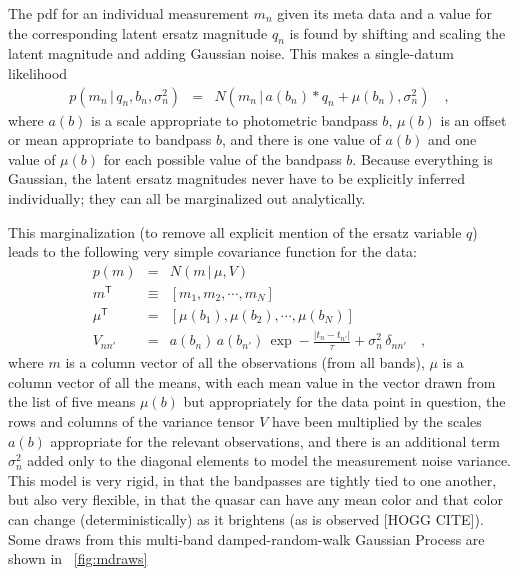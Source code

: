 \documentclass[letterpaper,12pt,preprint]{aastex}
\newcommand{\given}{\,|\,}
\newcommand{\transpose}[1]{{#1}^{\mathsf{T}}}
\begin{document}
The pdf for an individual measurement $m_n$ given its meta data and a
value for the corresponding latent ersatz magnitude $q_n$ is found by
shifting and scaling the latent magnitude and adding Gaussian noise.
This makes a single-datum likelihood
\begin{eqnarray}
p(m_n\given q_n,b_n,\sigma_n^2) &=& N(m_n\given a(b_n) * q_n + \mu(b_n), \sigma_n^2)
\quad ,
\end{eqnarray}
where $a(b)$ is a scale appropriate to photometric bandpass $b$,
$\mu(b)$ is an offset or mean appropriate to bandpass $b$, and there
is one value of $a(b)$ and one value of $\mu(b)$ for each possible
value of the bandpass $b$.  Because everything is Gaussian, the latent
ersatz magnitudes never have to be explicitly inferred individually;
they can all be marginalized out analytically.

This marginalization (to remove all explicit mention of the ersatz
variable $q$) leads to the following very simple covariance function
for the data:
\begin{eqnarray}
p(m) &=& N(m\given \mu,V)
\label{eq:likestart}
\\
\transpose{m} &\equiv& [m_1, m_2, \cdots , m_N]
\\
\transpose{\mu} &=& [\mu(b_1), \mu(b_2), \cdots , \mu(b_N)]
\\
V_{nn'} &=& a(b_n)\,a(b_{n'})\,\exp -\frac{|t_n - t_{n'}|}{\tau} + \sigma_n^2\,\delta_{nn'}
\label{eq:likeend}
\quad ,
\end{eqnarray}
where $m$ is a column vector of all the observations (from all bands),
$\mu$ is a column vector of all the means, with each mean value in the
vector drawn from the list of five means $\mu(b)$ but appropriately
for the data point in question, the rows and columns of the variance
tensor $V$ have been multiplied by the scales $a(b)$ appropriate for
the relevant observations, and there is an additional term
$\sigma_n^2$ added only to the diagonal elements to model the
measurement noise variance.  This model is very rigid, in that the
bandpasses are tightly tied to one another, but also very flexible, in
that the quasar can have any mean color and that color can change
(deterministically) as it brightens (as is observed [HOGG CITE]).
Some draws from this multi-band damped-random-walk Gaussian Process
are shown in \figurename~\ref{fig:mdraws}
\end{document}

